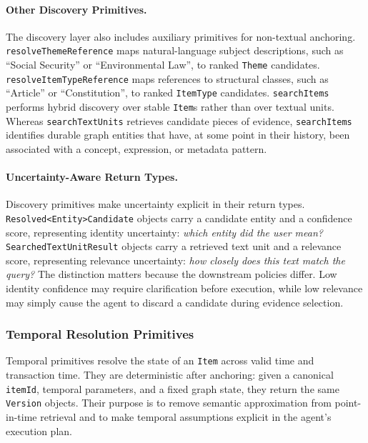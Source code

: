\documentclass[11pt]{article}
\begin{document}
\paragraph{Other Discovery Primitives.}
The discovery layer also includes auxiliary primitives for non-textual anchoring. \texttt{resolveThemeReference} maps natural-language subject descriptions, such as ``Social Security'' or ``Environmental Law'', to ranked \texttt{Theme} candidates. \texttt{resolveItemTypeReference} maps references to structural classes, such as ``Article'' or ``Constitution'', to ranked \texttt{ItemType} candidates. \texttt{searchItems} performs hybrid discovery over stable \texttt{Item}s rather than over textual units. Whereas \texttt{searchTextUnits} retrieves candidate pieces of evidence, \texttt{searchItems} identifies durable graph entities that have, at some point in their history, been associated with a concept, expression, or metadata pattern.

\paragraph{Uncertainty-Aware Return Types.}
Discovery primitives make uncertainty explicit in their return types. \texttt{Resolved<Entity>Candidate} objects carry a candidate entity and a confidence score, representing identity uncertainty: \textit{which entity did the user mean?} \texttt{SearchedTextUnitResult} objects carry a retrieved text unit and a relevance score, representing relevance uncertainty: \textit{how closely does this text match the query?} The distinction matters because the downstream policies differ. Low identity confidence may require clarification before execution, while low relevance may simply cause the agent to discard a candidate during evidence selection.

\subsubsection{Temporal Resolution Primitives}
\label{subsubsec:temporal_primitives}

Temporal primitives resolve the state of an \texttt{Item} across valid time and transaction time. They are deterministic after anchoring: given a canonical \texttt{itemId}, temporal parameters, and a fixed graph state, they return the same \texttt{Version} objects. Their purpose is to remove semantic approximation from point-in-time retrieval and to make temporal assumptions explicit in the agent's execution plan.
\end{document}
